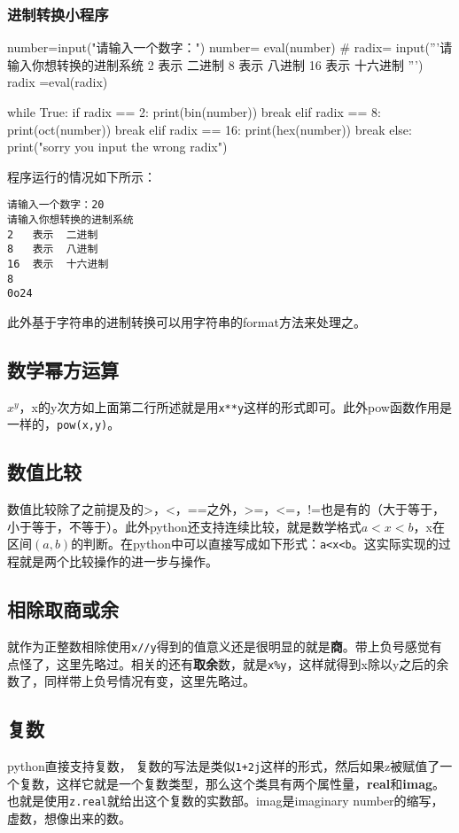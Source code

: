 \documentclass[12pt,oneside]{book}
\begin{document}
\begin{common-format}
\subsubsection{进制转换小程序}

\begin{tcbpython}[]
number=input("请输入一个数字：")
number= eval(number)
#
radix= input('''请输入你想转换的进制系统
2   表示  二进制
8   表示  八进制
16  表示  十六进制
''')
radix =eval(radix)

while True:
    if radix == 2:
        print(bin(number))
        break
    elif radix == 8:
        print(oct(number))
        break
    elif radix == 16:
        print(hex(number))
        break
    else:
        print("sorry you input the wrong radix")
\end{tcbpython}
程序运行的情况如下所示：
\begin{Verbatim}
请输入一个数字：20
请输入你想转换的进制系统
2   表示  二进制
8   表示  八进制
16  表示  十六进制
8
0o24
\end{Verbatim}

此外基于字符串的进制转换可以用字符串的format方法来处理之。



\subsection{数学幂方运算}
$ x^y $，x的y次方如上面第二行所述就是用\verb+x**y+这样的形式即可。此外pow函数作用是一样的，\verb+pow(x,y)+。


\subsection{数值比较}
数值比较除了之前提及的>，<，==之外，>=，<=，!=也是有的（大于等于，小于等于，不等于）。此外python还支持连续比较，就是数学格式$a<x<b$，x在区间$(a,b)$的判断。在python中可以直接写成如下形式：\verb+a<x<b+。这实际实现的过程就是两个比较操作的进一步与操作。

\subsection{相除取商或余}
就作为正整数相除使用\verb+x//y+得到的值意义还是很明显的就是\textbf{商}。带上负号感觉有点怪了，这里先略过。相关的还有\textbf{取余}数，就是\verb+x%y+，这样就得到x除以y之后的余数了，同样带上负号情况有变，这里先略过。



\subsection{复数}
python直接支持复数， 复数的写法是类似\verb|1+2j|这样的形式，然后如果z被赋值了一个复数，这样它就是一个复数类型，那么这个类具有两个属性量，\textbf{real}和\textbf{imag}。也就是使用\verb+z.real+就给出这个复数的实数部。imag是imaginary number的缩写，虚数，想像出来的数。


\end{common-format}
\end{document}
